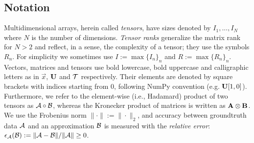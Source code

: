 \documentclass[review, twocolumn]{svjour3}          %
\newcommand{\FIXME}[1]{{\color{RED}{\textbf{FIX}: #1}}}
\begin{document}


\subsection{Notation}

Multidimensional arrays, herein called \emph{tensors}, have sizes denoted by $I_1, ..., I_N$ where $N$ is the number of dimensions. \emph{Tensor ranks} generalize the matrix rank for $N > 2$ and reflect, in a sense, the complexity of a tensor; they use the symbols $R_n$. For simplicity we sometimes use $I := \max \{I_n\}_n$ and $R := \max \{R_n\}_n$. Vectors, matrices and tensors use bold lowercase, bold uppercase and calligraphic letters as in $\vec{x}$, $\mathbf{U}$ and $\mathcal{T}$ respectively. Their elements are denoted by square brackets with indices starting from 0, following NumPy convention (e.g. $\mathbf{U}[1, 0]$). Furthermore, we refer to the element-wise (i.e., Hadamard) product of two tensors as $\mathcal{A} \circ \mathcal{B}$, whereas the Kronecker product of matrices is written as $\mathbf{A} \otimes \mathbf{B}$. We use the Frobenius norm $\| \cdot \| := \| \cdot \|_2$, and accuracy between groundtruth data $\mathcal{A}$ and an approximation $\mathcal{B}$ is measured with the \emph{relative error}: $\mbox{$\epsilon$}_{\mathcal{A}}(\mathcal{B}) := \|\mathcal{A} - \mathcal{B}\| / \|\mathcal{A}\| \ge 0$.
\end{document}
